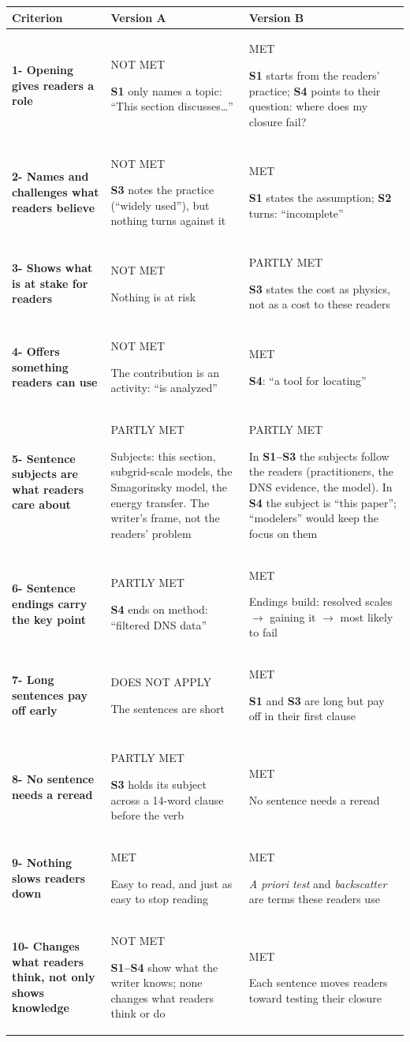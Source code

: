 \documentclass[11pt]{article}
\newcommand{\sref}[1]{{\sffamily\footnotesize\bfseries\color{accent}S#1}}     %
\newcommand{\srange}[2]{{\sffamily\footnotesize\bfseries\color{accent}S#1--S#2}}
\newcommand{\badge}[2]{{\setlength{\fboxsep}{1.6pt}\colorbox{#1}{\sffamily\scriptsize\bfseries\color{white}\strut#2}}}
\newcommand{\stS}{\badge{strongc}{MET}}
\newcommand{\stP}{\badge{partialc}{PARTLY MET}}
\newcommand{\stM}{\badge{missingc}{NOT MET}}
\newcommand{\stN}{\badge{muted}{DOES NOT APPLY}}
\begin{document}
{\footnotesize
\renewcommand{\arraystretch}{1.1}
\begin{tabularx}{\linewidth}{@{}>{\raggedright\arraybackslash\sffamily\footnotesize\bfseries}p{3.3cm}>{\raggedright\arraybackslash}X>{\raggedright\arraybackslash}X@{}}
\toprule
Criterion & \sffamily\footnotesize\bfseries Version A & \sffamily\footnotesize\bfseries Version B \\
\midrule
1- Opening gives readers a role & \stM{} \sref{1} only names a topic: ``This section discusses\ldots''
               & \stS{} \sref{1} starts from the readers' practice; \sref{4} points to their question: where does my closure fail? \\
2- Names and challenges what readers believe & \stM{} \sref{3} notes the practice (``widely used''), but nothing turns against it
               & \stS{} \sref{1} states the assumption; \sref{2} turns: ``incomplete'' \\
3- Shows what is at stake for readers & \stM{} Nothing is at risk
               & \stP{} \sref{3} states the cost as physics, not as a cost to these readers \\
4- Offers something readers can use & \stM{} The contribution is an activity: ``is analyzed''
               & \stS{} \sref{4}: ``a tool for locating'' \\
5- Sentence subjects are what readers care about & \stP{} Subjects: this section, subgrid-scale models, the Smagorinsky model, the energy transfer. The
                 writer's frame, not the readers' problem
               & \stP{} In \srange{1}{3} the subjects follow the readers (practitioners, the DNS evidence, the model).
                 In \sref{4} the subject is ``this paper''; ``modelers'' would keep the focus on them \\
6- Sentence endings carry the key point & \stP{} \sref{4} ends on method: ``filtered DNS data''
               & \stS{} Endings build: resolved scales $\to$ gaining it $\to$ most likely to fail \\
7- Long sentences pay off early & \stN{} The sentences are short
               & \stS{} \sref{1} and \sref{3} are long but pay off in their first clause \\
8- No sentence needs a reread & \stP{} \sref{3} holds its subject across a 14-word clause before the verb
               & \stS{} No sentence needs a reread \\
9- Nothing slows readers down & \stS{} Easy to read, and just as easy to stop reading
               & \stS{} \emph{A priori test} and \emph{backscatter} are terms these readers use \\
10- Changes what readers think, not only shows knowledge & \stM{} \srange{1}{4} show what the writer knows; none changes what readers think or do
               & \stS{} Each sentence moves readers toward testing their closure \\
\bottomrule
\end{tabularx}
\renewcommand{\arraystretch}{1}
}
\end{document}
